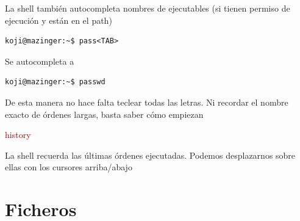\documentclass[ucs]{beamer}
\newcommand{\res}[1]{\textcolor{darkred}{#1}}
\begin{document}
\begin{frame}[fragile]

La shell también autocompleta nombres de ejecutables (si tienen 
permiso de ejecución y están en el path)

  \begin{footnotesize}
  \begin{verbatim}
koji@mazinger:~$ pass<TAB>
  \end{verbatim}
  \end{footnotesize}
Se autocompleta a 
  \begin{footnotesize}
  \begin{verbatim}
koji@mazinger:~$ passwd
  \end{verbatim}
  \end{footnotesize}

De esta manera no hace falta teclear todas las letras. Ni recordar el nombre exacto de órdenes largas, basta saber cómo empiezan

\res{history}

La shell recuerda las últimas
órdenes ejecutadas. Podemos desplazarnos sobre ellas con los cursores
arriba/abajo

\end{frame}







\section{Ficheros}
\end{document}

